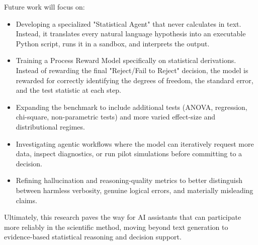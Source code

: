 \documentclass{article}
\begin{document}
Future work will focus on:
\begin{itemize}
    \item Developing a specialized "Statistical Agent" that never calculates in text. Instead, it translates every natural language hypothesis into an executable Python script, runs it in a sandbox, and interprets the output.
    \item Training a Process Reward Model specifically on statistical derivations. Instead of rewarding the final "Reject/Fail to Reject" decision, the model is rewarded for correctly identifying the degrees of freedom, the standard error, and the test statistic at each step.
    \item Expanding the benchmark to include additional tests (ANOVA, regression, chi-square, non-parametric tests) and more varied effect-size and distributional regimes.
    \item Investigating agentic workflows where the model can iteratively request more data, inspect diagnostics, or run pilot simulations before committing to a decision.
    \item Refining hallucination and reasoning-quality metrics to better distinguish between harmless verbosity, genuine logical errors, and materially misleading claims.
\end{itemize}
Ultimately, this research paves the way for AI assistants that can participate more reliably in the scientific method, moving beyond text generation to evidence-based statistical reasoning and decision support.



\end{document}
